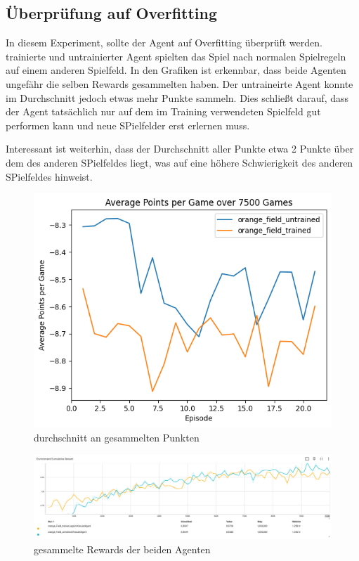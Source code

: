 \subsection{Überprüfung auf Overfitting}
In diesem Experiment, sollte der Agent auf Overfitting überprüft werden. trainierte und untrainierter Agent spielten das Spiel nach normalen Spielregeln auf einem anderen Spielfeld.
In den Grafiken ist erkennbar, dass beide Agenten ungefähr die selben Rewards gesammelten haben. Der untraineirte Agent konnte im Durchschnitt jedoch etwas mehr Punkte sammeln.
Dies schließt darauf, dass der Agent tatsächlich nur auf dem im Training verwendeten Spielfeld gut performen kann und neue SPielfelder erst erlernen muss.

Interessant ist weiterhin, dass der Durchschnitt aller Punkte etwa 2 Punkte über dem des anderen SPielfeldes liegt, was auf eine höhere Schwierigkeit des anderen SPielfeldes hinweist.


\begin{figure}[!t]
    \centering
    \includegraphics[scale=0.6]{Bilder/orange_field_evaluation.png}
    \caption{durchschnitt an gesammelten Punkten}
\end{figure}
\begin{figure}[!t]
    \centering
    \includegraphics[scale=0.3]{Bilder/orange_field_trained_vs_untrained.png}
    \caption{gesammelte Rewards der beiden Agenten}
\end{figure}

